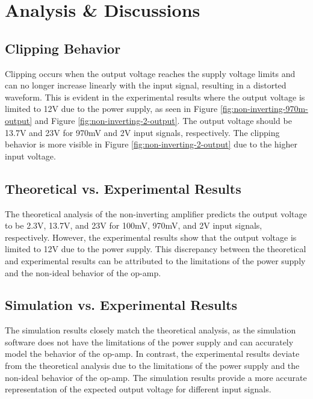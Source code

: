 \chapter{Analysis \& Discussions}

\section{Clipping Behavior}

Clipping occurs when the output voltage reaches the supply voltage limits and can no longer increase linearly with the input signal, resulting in a distorted waveform. This is evident in the experimental results where the output voltage is limited to 12V due to the power supply, as seen in Figure \ref{fig:non-inverting-970m-output} and Figure \ref{fig:non-inverting-2-output}. The output voltage should be 13.7V and 23V for 970mV and 2V input signals, respectively. The clipping behavior is more visible in Figure \ref{fig:non-inverting-2-output} due to the higher input voltage.

\section{Theoretical vs. Experimental Results}

The theoretical analysis of the non-inverting amplifier predicts the output voltage to be 2.3V, 13.7V, and 23V for 100mV, 970mV, and 2V input signals, respectively. However, the experimental results show that the output voltage is limited to 12V due to the power supply. This discrepancy between the theoretical and experimental results can be attributed to the limitations of the power supply and the non-ideal behavior of the op-amp.

\section{Simulation vs. Experimental Results}

The simulation results closely match the theoretical analysis, as the simulation software does not have the limitations of the power supply and can accurately model the behavior of the op-amp. In contrast, the experimental results deviate from the theoretical analysis due to the limitations of the power supply and the non-ideal behavior of the op-amp. The simulation results provide a more accurate representation of the expected output voltage for different input signals.

